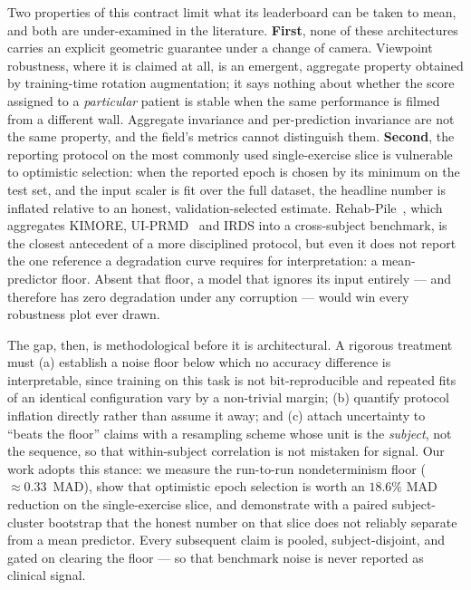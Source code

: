 \documentclass[11pt]{article}
\begin{document}
Two properties of this contract limit what its leaderboard can be taken to mean, and both are
under-examined in the literature. \textbf{First}, none of these architectures carries an explicit
geometric guarantee under a change of camera. Viewpoint robustness, where it is claimed at all, is an
emergent, aggregate property obtained by training-time rotation augmentation; it says nothing about
whether the score assigned to a \emph{particular} patient is stable when the same performance is filmed
from a different wall. Aggregate invariance and per-prediction invariance are not the same property, and
the field's metrics cannot distinguish them. \textbf{Second}, the reporting protocol on the most
commonly used single-exercise slice is vulnerable to optimistic selection: when the reported epoch is
chosen by its minimum on the test set, and the input scaler is fit over the full dataset, the headline
number is inflated relative to an honest, validation-selected estimate. Rehab-Pile~\cite{rehabpile2026},
which aggregates KIMORE, UI-PRMD~\cite{vakanski2018uiprmd} and IRDS into a cross-subject benchmark, is
the closest antecedent of a more disciplined protocol, but even it does not report the one reference a
degradation curve requires for interpretation: a mean-predictor floor. Absent that floor, a model that
ignores its input entirely --- and therefore has zero degradation under any corruption --- would win
every robustness plot ever drawn.

The gap, then, is methodological before it is architectural. A rigorous treatment must (a) establish a
noise floor below which no accuracy difference is interpretable, since training on this task is not
bit-reproducible and repeated fits of an identical configuration vary by a non-trivial margin; (b)
quantify protocol inflation directly rather than assume it away; and (c) attach uncertainty to
``beats the floor'' claims with a resampling scheme whose unit is the \emph{subject}, not the sequence,
so that within-subject correlation is not mistaken for signal. Our work adopts this stance: we measure
the run-to-run nondeterminism floor ($\approx\!0.33$~MAD), show that optimistic epoch selection is worth
an $18.6\%$ MAD reduction on the single-exercise slice, and demonstrate with a paired subject-cluster
bootstrap that the honest number on that slice does not reliably separate from a mean predictor. Every
subsequent claim is pooled, subject-disjoint, and gated on clearing the floor --- so that benchmark
noise is never reported as clinical signal.

\end{document}
